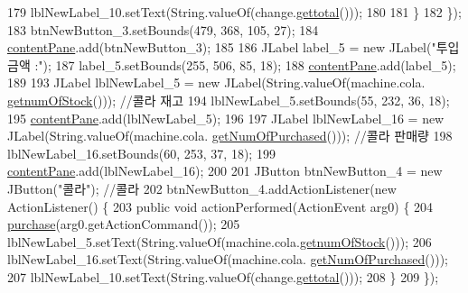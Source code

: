 \begin{DoxyCode}
179                 lblNewLabel\_10.setText(String.valueOf(change.\hyperlink{class_vending_machine_1_1_change_a07a32d7240178343fa1273d075d73c64}{gettotal}()));
180 
181             \}
182         \});
183         btnNewButton\_3.setBounds(479, 368, 105, 27);
184         \hyperlink{class_vending_machine_1_1_machine_u_i_ac8ef25585e46da798d067af0eefa1a03}{contentPane}.add(btnNewButton\_3);     
185         
186         JLabel label\_5 = \textcolor{keyword}{new} JLabel(\textcolor{stringliteral}{"투입금액 :"});
187         label\_5.setBounds(255, 506, 85, 18);
188         \hyperlink{class_vending_machine_1_1_machine_u_i_ac8ef25585e46da798d067af0eefa1a03}{contentPane}.add(label\_5);
189         
193         JLabel lblNewLabel\_5 = \textcolor{keyword}{new} JLabel(String.valueOf(machine.cola.
      \hyperlink{class_vending_machine_1_1_product_a199bec8565bf69e9231248a49076a01b}{getnumOfStock}())); \textcolor{comment}{//콜라 재고}
194         lblNewLabel\_5.setBounds(55, 232, 36, 18);
195         \hyperlink{class_vending_machine_1_1_machine_u_i_ac8ef25585e46da798d067af0eefa1a03}{contentPane}.add(lblNewLabel\_5);      
196         
197         JLabel lblNewLabel\_16 = \textcolor{keyword}{new} JLabel(String.valueOf(machine.cola.
      \hyperlink{class_vending_machine_1_1_product_aefa8a5881c5569171a8cf1161b4bd911}{getNumOfPurchased}())); \textcolor{comment}{//콜라 판매량}
198         lblNewLabel\_16.setBounds(60, 253, 37, 18);
199         \hyperlink{class_vending_machine_1_1_machine_u_i_ac8ef25585e46da798d067af0eefa1a03}{contentPane}.add(lblNewLabel\_16);
200         
201         JButton btnNewButton\_4 = \textcolor{keyword}{new} JButton(\textcolor{stringliteral}{"콜라"}); \textcolor{comment}{//콜라}
202         btnNewButton\_4.addActionListener(\textcolor{keyword}{new} ActionListener() \{
203             \textcolor{keyword}{public} \textcolor{keywordtype}{void} actionPerformed(ActionEvent arg0) \{
204                 \hyperlink{class_vending_machine_1_1_machine_u_i_aadccf593dc69281c9ebbfe1fbe09b804}{purchase}(arg0.getActionCommand());
205                 lblNewLabel\_5.setText(String.valueOf(machine.cola.\hyperlink{class_vending_machine_1_1_product_a199bec8565bf69e9231248a49076a01b}{getnumOfStock}()));
206                 lblNewLabel\_16.setText(String.valueOf(machine.cola.
      \hyperlink{class_vending_machine_1_1_product_aefa8a5881c5569171a8cf1161b4bd911}{getNumOfPurchased}()));
207                 lblNewLabel\_10.setText(String.valueOf(change.\hyperlink{class_vending_machine_1_1_change_a07a32d7240178343fa1273d075d73c64}{gettotal}()));
208             \}
209         \});

\end{DoxyCode}
